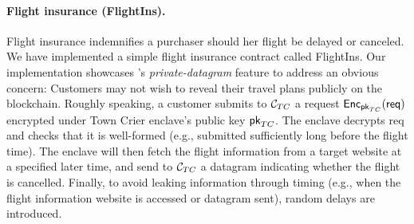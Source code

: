 \paragraph{Flight insurance ({\sf FlightIns}).}
Flight insurance indemnifies a purchaser should her flight be delayed or canceled.
We have implemented a simple flight insurance contract called {\sf FlightIns}.
Our implementation showcases \tc's {\it private-datagram} feature to address an obvious concern:
Customers may not wish to reveal their travel plans publicly on the blockchain. 
Roughly speaking, 
a customer submits to ${\cal C}_{TC}$ a 
request ${\sf Enc}_{{\sf pk}_{TC}}({\sf req})$ 
encrypted under Town Crier enclave's public 
key ${\sf pk}_{TC}$. The enclave decrypts
{\sf req} and checks that it is well-formed (e.g., submitted
sufficiently long before the flight time).
The enclave will then fetch the flight information from a target website
at a specified later time, and send to ${\cal C}_{TC}$ a datagram indicating
whether the flight is cancelled. 
Finally, to avoid leaking information through timing (e.g.,
when the flight 
information website is accessed or datagram sent), random delays are introduced.


